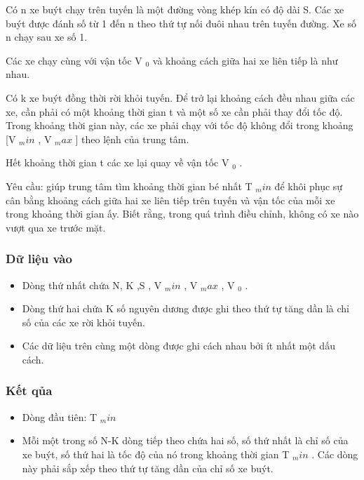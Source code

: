 



   Có n xe buýt chạy trên tuyến là một đường vòng khép kín có độ dài S. Các xe buýt được đánh số từ 1 đến n theo thứ tự nối đuôi nhau trên tuyến đường. Xe số n chạy sau xe số 1.  

   Các xe chạy cùng với vận tốc V   $_    0   $   và khoảng cách giữa hai xe liên tiếp là như nhau.  

   Có k xe buýt đồng thời rời khỏi tuyến. Để trở lại khoảng cách đều nhau giữa các xe, cần phải có một khoảng thời gian t và một số xe cần phải thay   đổi tốc độ. Trong khoảng thời gian này, các xe phải chạy với tốc độ không đổi trong khoảng [V   $_    min   $   , V   $_    max   $   ] theo lệnh của   trung tâm.  

   Hết khoảng thời gian t các xe lại quay về vận tốc V   $_    0   $   .  

   Yêu cầu: giúp trung tâm tìm khoảng thời gian bé nhất T   $_    min   $   để khôi phục sự cân bằng khoảng cách giữa hai xe liên tiếp trên tuyến và   vận tốc của mỗi xe trong khoảng thời gian ấy. Biết rằng, trong quá trình điều chỉnh, không có xe nào vượt qua xe trước mặt.  

\subsubsection{   Dữ liệu vào  }
\begin{itemize}
	\item     Dòng thứ nhất chứa N, K ,S , V    $_     min    $    , V    $_     max    $    , V    $_     0    $    .   
	\item     Dòng thứ hai chứa K số nguyên dương được ghi theo thứ tự tăng dần là chỉ số của các xe rời khỏi tuyến.   
	\item     Các dữ liệu trên cùng một dòng được ghi cách nhau bởi ít nhất một dấu cách.   
\end{itemize}

\subsubsection{   Kết qủa  }
\begin{itemize}
	\item     Dòng đầu tiên: T    $_     min    $
	\item     Mỗi một trong số N-K dòng tiếp theo chứa hai số, số thứ nhất là chỉ số của xe buýt, số thứ hai là tốc độ của nó trong khoảng thời gian   T    $_     min    $    . Các dòng này phải sắp xếp theo thứ tự tăng dần của chỉ số xe buýt.   
\end{itemize}

